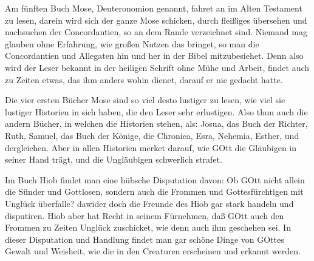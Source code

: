 Am fünften Buch Mose, Deuteronomion genannt, fahret an im Alten Testament zu lesen, darein wird sich der ganze Mose schicken, durch fleißiges
übersehen und nachsuchen der Concordantien, so an dem Rande verzeichnet sind. Niemand mag glauben ohne Erfahrung, wie großen Nutzen das bringet, so man die Concordantien und Allegaten hin und her in der Bibel mitzubesiehet. Denn also wird der Leser bekannt in der heiligen Schrift ohne Mühe und Arbeit, findet auch zu Zeiten etwas, das ihm anders wohin dienet, darauf er nie gedacht hatte.

Die vier ersten Bücher Mose sind so viel desto lustiger zu lesen, wie viel sie lustiger Historien in sich haben, die den Leser sehr erlustigen. Also thun auch die andern Bücher, in welchen die Historien stehen, als: Josua, das Buch der Richter, Ruth, Samuel, das Buch der Könige, die Chronica, Esra, Nehemia, Esther, und dergleichen. Aber in allen Historien merket darauf, wie GOtt die Gläubigen in seiner Hand trägt, und die Ungläubigen schwerlich strafet.

Im Buch Hiob findet man eine hübsche Disputation davon: Ob GOtt nicht allein die Sünder und Gottlosen, sondern auch die Frommen und Gottesfürchtigen mit Unglück überfalle? dawider doch die Freunde des Hiob gar stark handeln und disputiren. Hiob aber hat Recht in seinem Fürnehmen, daß GOtt auch den Frommen zu Zeiten Unglück zuschicket, wie denn auch ihm geschehen sei. In dieser Disputation und Handlung findet man gar schöne Dinge von GOttes Gewalt und Weisheit, wie die in den Creaturen erscheinen und erkannt werden.

